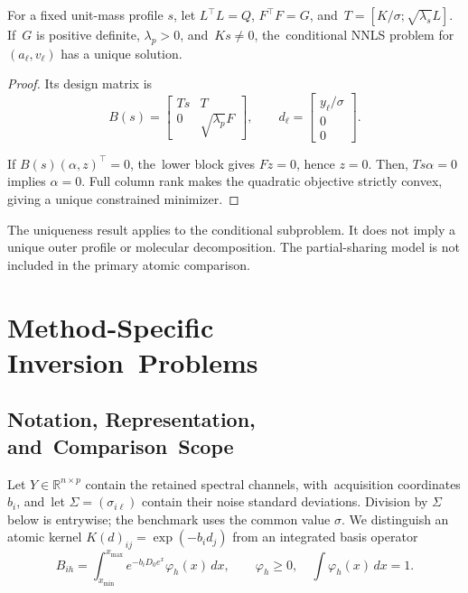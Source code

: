 \documentclass[mathematics,article,accept,moreauthors]{Definitions/mdpi}
\newcommand{\R}{\mathbb{R}}
\begin{document}
\begin{Proposition}\label{prop:partial}
For a fixed unit-mass profile $s$, let $L^\top L=Q$, $F^\top F=G$, and~$T=[K/\sigma;\sqrt{\lambda_s}L]$. If~$G$ is positive definite, $\lambda_p>0$, and~$Ks\ne0$, the~conditional NNLS problem for $(a_\ell,v_\ell)$ has a unique solution.
\end{Proposition}
\begin{proof}
Its design matrix is
\begin{equation}\label{eq:partialdesign}
 B(s)=\begin{bmatrix}Ts&T\\0&\sqrt{\lambda_p}F\end{bmatrix},\qquad
 d_\ell=\begin{bmatrix}y_\ell/\sigma\\0\\0\end{bmatrix}.
\end{equation}

If $B(s)(\alpha,z)^\top=0$, the~lower block gives $Fz=0$, hence $z=0$. Then, $Ts\alpha=0$ implies $\alpha=0$. Full column rank makes the quadratic objective strictly convex, giving a unique constrained minimizer.
\end{proof}

The uniqueness result applies to the conditional subproblem. It does not imply a unique outer profile or molecular decomposition. The partial-sharing model is not included in the primary atomic comparison.

%


\section{Method-Specific Inversion~Problems}\label{sec:methods}

\subsection{Notation, Representation, and~Comparison~Scope}
Let $Y\in\R^{n\times p}$ contain the retained spectral channels, with~acquisition coordinates $b_i$, and~let $\Sigma=(\sigma_{i\ell})$ contain their noise standard deviations. Division by $\Sigma$ below is entrywise; the benchmark uses the common value $\sigma$. We distinguish an atomic kernel $K(d)_{ij}=\exp(-b_i d_j)$ from an integrated basis operator
\begin{equation}\label{eq:integratedbasis}
 B_{ih}=\int_{x_{\min}}^{x_{\max}}e^{-b_iD_0e^x}\varphi_h(x)\,dx,
 \qquad \varphi_h\geq0,\quad \int\varphi_h(x)\,dx=1.
\end{equation}
\end{document}
